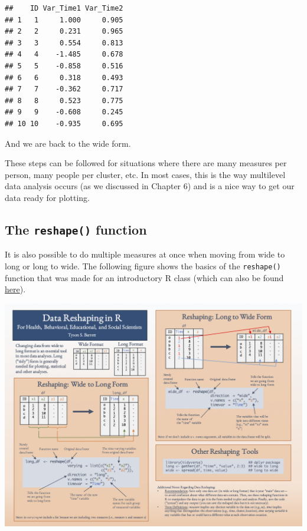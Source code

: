 \documentclass[]{tufte-book}
\theoremstyle{definition}
\theoremstyle{definition}
\theoremstyle{remark}
\begin{document}
\begin{verbatim}
##    ID Var_Time1 Var_Time2
## 1   1     1.000     0.905
## 2   2     0.231     0.965
## 3   3     0.554     0.813
## 4   4    -1.485     0.678
## 5   5    -0.858     0.516
## 6   6     0.318     0.493
## 7   7    -0.362     0.717
## 8   8     0.523     0.775
## 9   9    -0.608     0.245
## 10 10    -0.935     0.695
\end{verbatim}

And we are back to the wide form.

These steps can be followed for situations where there are many measures
per person, many people per cluster, etc. In most cases, this is the way
multilevel data analysis occurs (as we discussed in Chapter 6) and is a
nice way to get our data ready for plotting.

\subsection*{\texorpdfstring{The \texttt{reshape()}
function}{The reshape() function}}\label{the-reshape-function}

It is also possible to do multiple measures at once when moving from
wide to long or long to wide. The following figure shows the basics of
the \texttt{reshape()} function that was made for an introductory R
class (which can also be found
\href{https://tysonstanley.github.io/assets/images/DataCleaning_Handout.pdf}{here}).

\includegraphics[width=\linewidth]{DataCleaning_Handout.png}
\end{document}
